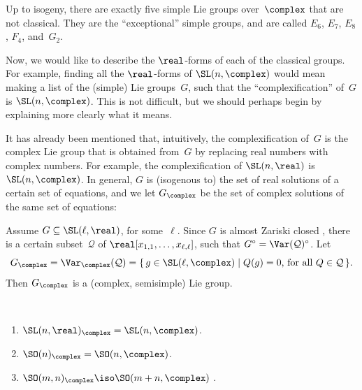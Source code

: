 \begin{rem} \label{EFGOverCRem}
Up to isogeny, there are exactly five simple Lie groups over~$\complex$ that are not classical. They are the ``exceptional'' simple groups, and are called $E_6$, $E_7$, $E_8$, $F_4$, and~$G_2$.
\end{rem}

Now, we would like to describe the $\real$-forms of each of the classical groups. For example, finding all the $\real$-forms of $\SL(n,\complex)$ would mean making a list of the (simple) Lie groups~$G$, such that the ``complexification'' of~$G$ is $\SL(n,\complex)$. This is not difficult, but we should perhaps begin by explaining more clearly what it means.

It has already been mentioned that, intuitively, the complexification of~$G$ is the
complex Lie group that is obtained from~$G$ by replacing
real numbers with complex numbers. 
 For example,
the complexification of $\SL(n,\real)$ is $\SL(n,\complex)$. In general, $G$ is
(isogenous to) the set of real solutions of a certain set of
equations, and we let $G_{\complex}$ be the set of
complex solutions of the same set of equations:

\begin{notation} \label{GxCNot}
 Assume $G \subseteq \SL(\ell,\real)$, for some~$\ell$. Since $G$ is almost Zariski closed , there
is a certain subset~$\mathcal{Q}$ of $\real[x_{1,1}, \ldots,
x_{\ell,\ell}]$, such that $G^\circ = \Var(\mathcal{Q})^\circ$. Let
 $$ G_{\complex} = \Var_{\complex}(\mathcal{Q})
 = \{\, g \in \SL(\ell,\complex) \mid \mbox{$Q(g) = 0$, for
all $Q \in \mathcal{Q}$} \,\} .$$
 Then $G_{\complex}$ is a (complex, semisimple) Lie
group.
 \end{notation}

\begin{eg} \label{GxCEg}
 \ 
 \begin{enumerate}
 \item \label{GxCEg-SL}
 $\SL(n,\real)_{\complex} = \SL(n,\complex)$. 
 \item \label{GxCEg-SO}
 $\SO(n)_{\complex} = \SO(n,\complex)$.
 \item \label{GxCEg-SOpq}
 $\SO(m,n)_{\complex} \iso \SO(m+n,\complex)$
.
 \end{enumerate}
 \end{eg}

